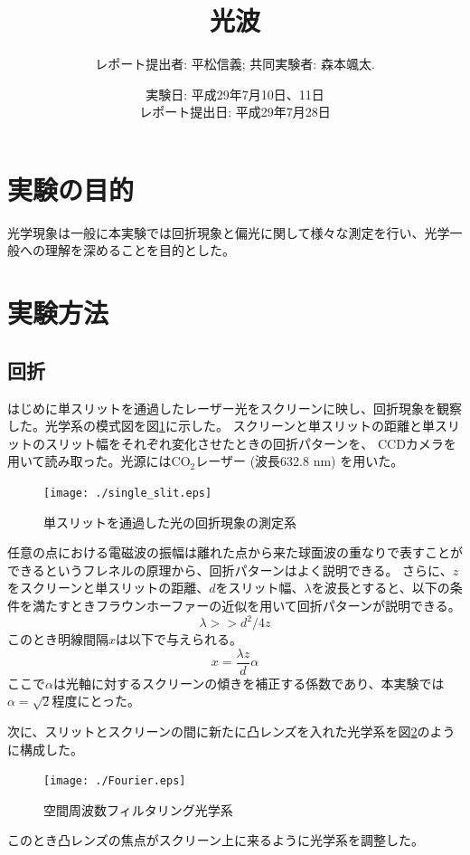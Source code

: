 \documentclass[11pt,a4]{jarticle}
\begin{document}
\title{光波}
\author{レポート提出者: 平松信義; 共同実験者: 森本颯太.}
\date{実験日: 平成29年7月10日、11日\\レポート提出日: 平成29年7月28日}
\maketitle
\tableofcontents

\section{実験の目的}
光学現象は一般に本実験では回折現象と偏光に関して様々な測定を行い、光学一般への理解を深めることを目的とした。

\section{実験方法}
\subsection{回折}
はじめに単スリットを通過したレーザー光をスクリーンに映し、回折現象を観察した。光学系の模式図を図\ref{fig:single_slit}に示した。
スクリーンと単スリットの距離と単スリットのスリット幅をそれぞれ変化させたときの回折パターンを、
CCDカメラを用いて読み取った。光源にはCO$_2$レーザー (波長632.8 nm) を用いた。
\begin{figure}[htbp]
   \begin{center}
    \texttt{[image: ./single\_slit.eps]}
    \caption{単スリットを通過した光の回折現象の測定系}
     \label{fig:single_slit}
   \end{center}
\end{figure}

任意の点における電磁波の振幅は離れた点から来た球面波の重なりで表すことができるというフレネルの原理から、回折パターンはよく説明できる。
さらに、$z$をスクリーンと単スリットの距離、$d$をスリット幅、$\lambda$を波長とすると、以下の条件を満たすときフラウンホーファーの近似を用いて回折パターンが説明できる。
\begin{equation}
\lambda >> d^2 /4z
\label{eq:joken}
\end{equation}
このとき明線間隔$x$は以下で与えられる。
\begin{equation}
x =  \frac{\lambda z}{d} \alpha
\label{eq:meisen}
\end{equation}
ここで$\alpha$は光軸に対するスクリーンの傾きを補正する係数であり、本実験では$\alpha=\sqrt{2}$程度にとった。

次に、スリットとスクリーンの間に新たに凸レンズを入れた光学系を図\ref{fig:Fourier}のように構成した。
\begin{figure}[htbp]
   \begin{center}
    \texttt{[image: ./Fourier.eps]}
    \caption{空間周波数フィルタリング光学系}
     \label{fig:Fourier}
   \end{center}
\end{figure}
このとき凸レンズの焦点がスクリーン上に来るように光学系を調整した。
\end{document}
